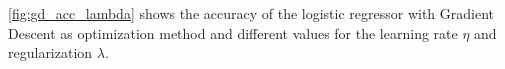 \autoref{fig:gd_acc_lambda} shows the accuracy of the logistic regressor with Gradient Descent as optimization method and different values for the learning rate $\eta$ and regularization $\lambda$.

\begin{figure}[H]
\centering
{}
\qquad
{}
\qquad
{}

\end{figure}

